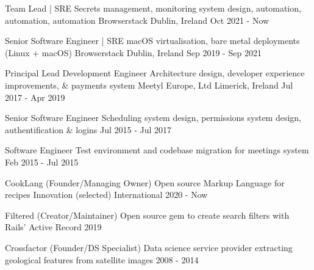 
\begin{cventries}

    \cvblitz
    {Team Lead | SRE} %
    {Secrets management, monitoring system design, automation, automation, automation}
    {Browserstack} %
    {Dublin, Ireland} %
    {Oct 2021 - Now} %

    \cvblitz
    {Senior Software Engineer | SRE} %
    {macOS virtualisation, bare metal deployments (Linux + macOS)}
    {Browserstack} %
    {Dublin, Ireland} %
    {Sep 2019 - Sep 2021} %

    \cvblitz
    {Principal Lead Development Engineer} %
    {Architecture design, developer experience improvements, \& payments system}
    {Meetyl Europe, Ltd} %
    {Limerick, Ireland} %
    {Jul 2017 - Apr 2019} %

    \cvblitz
    {Senior Software Engineer} %
    {Scheduling system design, permissions system design, authentification \& logins} %
    {} %
    {} %
    {Jul 2015 - Jul 2017} %

    \cvblitz
    {Software Engineer} %
    {Test environment and codebase migration for meetings system} %
    {} %
    {} %
    {Feb 2015 - Jul 2015} %

    \cvblitz
    {CookLang (Founder/Managing Owner)} %
    {Open source Markup Language for recipes} %
    {Innovation (selected)} %
    {International} %
    {2020 - Now} %

    \cvblitz
    {Filtered (Creator/Maintainer)} %
    {Open source gem to create search filters with Rails’ Active Record} %
    {} %
    {} %
    {2019} %

    \cvblitz
    {Crossfactor (Founder/DS Specialist)} %
    {Data science service provider extracting geological features from satellite images} %
    {} %
    {} %
    {2008 - 2014} %


\end{cventries}
